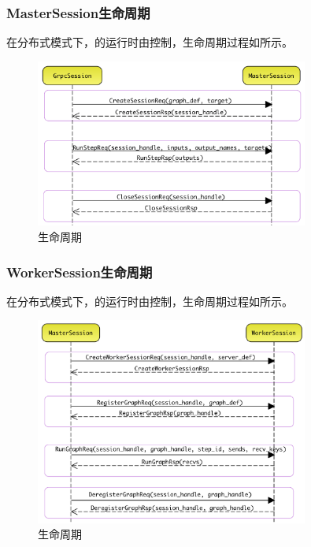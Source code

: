 \begin{content}
\subsubsection{MasterSession生命周期}

在分布式模式下，的运行时由控制，生命周期过程如所示。

\begin{figure}[H]
\centering
\includegraphics[width=0.8\textwidth]{figures/dist-master-session-life-cycle.png}
\caption{生命周期}
 \label{fig:dist-master-session-life-cycle}
\end{figure}

\subsubsection{WorkerSession生命周期}

在分布式模式下，的运行时由控制，生命周期过程如所示。

\begin{figure}[H]
\centering
\includegraphics[width=0.8\textwidth]{figures/dist-worker-session-life-cycle.png}
\caption{生命周期}
 \label{fig:dist-worker-session-life-cycle}
\end{figure}


\end{content}
